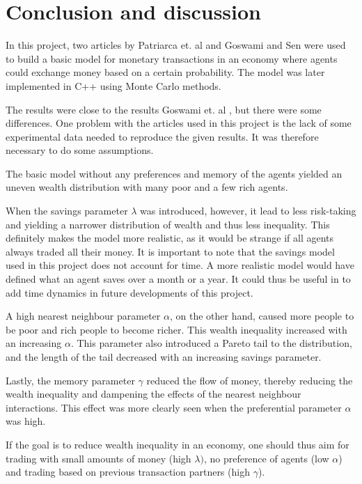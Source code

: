 \documentclass[11pt,a4paper,titlepage]{article}
\begin{document}
\section{Conclusion and discussion}
In this project, two articles by Patriarca et. al \cite{Patriarca} and  
Goswami and Sen \cite{Goswami} were used to build a basic model for monetary transactions in an economy where agents could exchange money based on a certain probability. The model was later implemented in C++ using Monte Carlo methods.

The results were close to the results Goswami et. al \cite{Goswami}, but there were some differences. One problem with the articles used in this project is the lack of some experimental data needed to reproduce the given results. It was therefore necessary to do some assumptions.

The basic model without any preferences and memory of the agents yielded an uneven wealth distribution with many poor and a few rich agents. 

When the savings parameter $\lambda$ was introduced, however, it lead to less risk-taking and yielding a narrower distribution of wealth and thus less inequality. This definitely makes the model more realistic, as it would be strange if all agents always traded all their money. It is important to note that the savings model used in this project does not account for time. A more realistic model would have defined what an agent saves over a month or a year. It could thus be useful in to add time dynamics in future developments of this project. 

A high nearest neighbour parameter $\alpha$, on the other hand, caused more people to be poor and rich people to become richer. This wealth inequality increased with an increasing $\alpha$. This parameter also introduced a Pareto tail to the distribution, and the length of the tail decreased with an increasing savings parameter. 

Lastly, the memory parameter $\gamma$ reduced the flow of money, thereby reducing the wealth inequality and dampening the effects of the nearest neighbour interactions. This effect was more clearly seen when the preferential parameter $\alpha$ was high. 

If the goal is to reduce wealth inequality in an economy, one should thus aim for trading with small amounts of money (high $\lambda)$, no preference of agents (low $\alpha$) and trading based on previous transaction partners (high $\gamma$).
\end{document}
